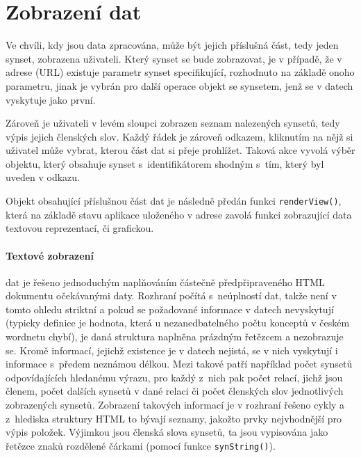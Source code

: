 \documentclass[a4paper, 11pt, oneside, showtrims]{book}
\begin{document}
			\section{Zobrazení dat}

				Ve chvíli, kdy jsou data zpracována, může být jejich příslušná část, tedy jeden synset, zobrazena uživateli. Který synset se bude zobrazovat, je v případě, že v adrese (URL) existuje parametr synset specifikující, rozhodnuto na základě onoho parametru, jinak je vybrán pro další operace objekt se synsetem, jenž se v datech vyskytuje jako první. 

				Zároveň je uživateli v levém sloupci zobrazen seznam nalezených synsetů, tedy výpis jejich členských slov. Každý řádek je zároveň odkazem, kliknutím na nějž si uživatel může vybrat, kterou část dat si přeje prohlížet. Taková akce vyvolá výběr objektu, který obsahuje synset s~identifikátorem shodným s~tím, který byl uveden v odkazu.

				Objekt obsahující příslušnou část dat je následně předán funkci \texttt{renderView()}, která na základě stavu aplikace uloženého v adrese zavolá funkci zobrazující data textovou reprezentací, či grafickou.

				\paragraph{Textové zobrazení} dat je řešeno jednoduchým naplňováním částečně předpřipraveného HTML dokumentu očekávanými daty. Rozhraní počítá s~neúplností dat, takže není v tomto ohledu striktní a pokud se požadované informace v datech nevyskytují (typicky definice je hodnota, která u nezanedbatelného počtu konceptů v českém wordnetu chybí), je daná struktura naplněna prázdným řetězcem a nezobrazuje se. Kromě informací, jejichž existence je v datech nejistá, se v nich vyskytují i informace s~předem neznámou délkou. Mezi takové patří například počet synsetů odpovídajících hledanému výrazu, pro každý z~nich pak počet relací, jichž jsou členem, počet dalších synsetů v dané relaci či počet členských slov jednotlivých zobrazených synsetů. Zobrazení takových informací je v rozhraní řešeno cykly a z~hlediska struktury HTML to bývají seznamy, jakožto prvky nejvhodnější pro výpis položek. Výjimkou jsou členská slova synsetů, ta jsou vypisována jako řetězce znaků rozdělené čárkami (pomocí funkce \texttt{synString()}).
\end{document}
